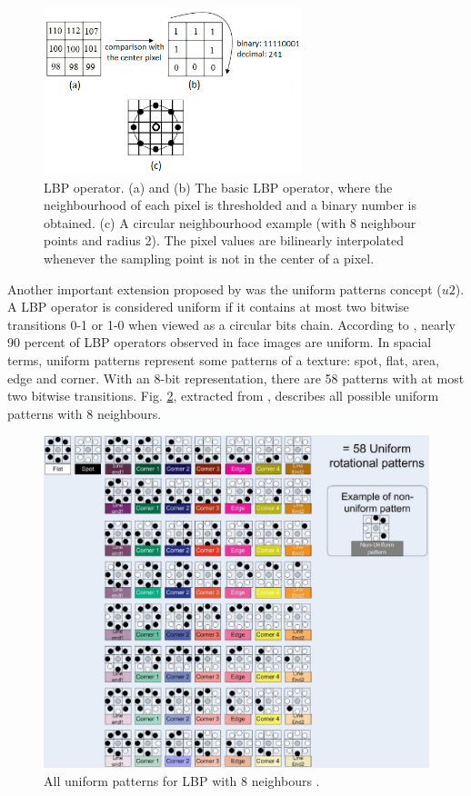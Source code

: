 \begin{appendices}
\begin{figure}
\begin{center}
\includegraphics [width=7.5cm] {images/lbp_operator}
\caption[LBP operator]{LBP operator. (a) and (b) The basic LBP operator, where the neighbourhood of each pixel is thresholded and a binary number is obtained. (c) A circular neighbourhood example (with 8 neighbour points and radius 2). The pixel values are bilinearly interpolated whenever the sampling point is not in the center of a pixel.} \label{fig_lbpOperator}
\end{center}
\end{figure}

Another important extension proposed by \cite{ojala2002multiresolution} was the uniform patterns concept ($u2$). A LBP operator is considered uniform if it contains at most two bitwise transitions 0-1 or 1-0 when viewed as a circular bits chain. According to \cite{ojala2002multiresolution}, nearly 90 percent of LBP operators observed in face images are uniform. In spacial terms, uniform patterns represent some patterns of a texture: spot, flat, area, edge and corner. With an 8-bit representation, there are 58 patterns with at most two bitwise transitions. Fig. \ref{fig_uniformPattern}, extracted from \cite{chan2007multi}, describes all possible uniform patterns with 8 neighbours.

\begin{figure}
\begin{center}
\includegraphics [width=12cm] {images/fig_uniformPattern} 
\end{center}
   \caption[All uniform patterns for LBP with 8 neighbours]{All uniform patterns for LBP with 8 neighbours \cite{chan2007multi}.}   
\label{fig_uniformPattern}
\end{figure}


\end{appendices}
